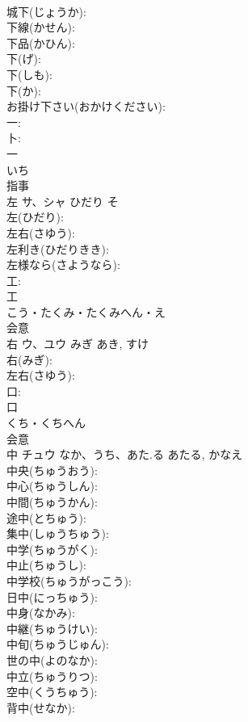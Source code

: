 \documentclass[8pt]{extreport}
\begin{document}
\begin{CJK}{UTF8}{min}
\\	城下(じょうか): 
\\	下線(かせん): 
\\	下品(かひん): 
\\	下(げ): 
\\	下(しも): 
\\	下(か): 
\\	お掛け下さい(おかけください): 
\\	一: 
\\	卜: 
\\	一	
\\	いち	
\\	指事 
\\	左	サ、シャ	ひだり	そ	
\\	左(ひだり): 
\\	左右(さゆう): 
\\	左利き(ひだりきき): 
\\	左様なら(さようなら): 
\\	工: 
\\	工	
\\	こう・たくみ・たくみへん・え	
\\	会意 
\\	右	ウ、ユウ	みぎ	あき, すけ	
\\	右(みぎ): 
\\	左右(さゆう): 
\\	口: 
\\	口	
\\	くち・くちへん	
\\	会意 
\\	中	チュウ	なか、うち、あた.る	あたる, かなえ	
\\	中央(ちゅうおう): 
\\	中心(ちゅうしん): 
\\	中間(ちゅうかん): 
\\	途中(とちゅう): 
\\	集中(しゅうちゅう): 
\\	中学(ちゅうがく): 
\\	中止(ちゅうし): 
\\	中学校(ちゅうがっこう): 
\\	日中(にっちゅう): 
\\	中身(なかみ): 
\\	中継(ちゅうけい): 
\\	中旬(ちゅうじゅん): 
\\	世の中(よのなか): 
\\	中立(ちゅうりつ): 
\\	空中(くうちゅう): 
\\	背中(せなか): 

\end{CJK}
\end{document}
